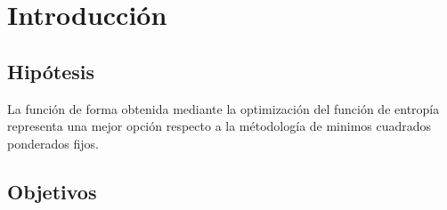 \chapter{Introducción}


%	




\section{Hipótesis}
La función de forma obtenida mediante la optimización del función de entropía representa una mejor opción respecto a la métodología de minimos cuadrados ponderados fijos. 

\section{Objetivos}
